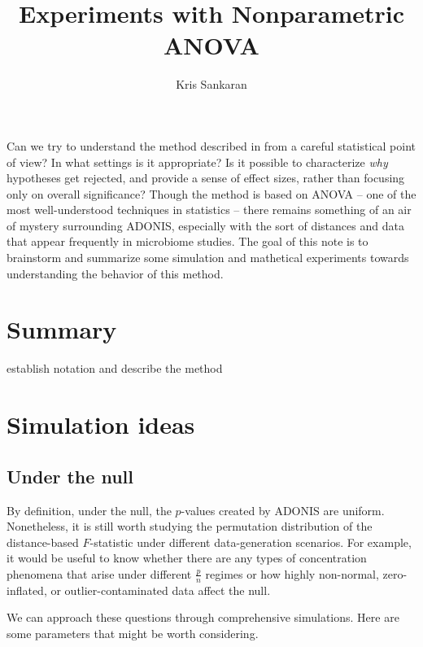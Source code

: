 \documentclass{article}
\title{Experiments with Nonparametric ANOVA}
\author{Kris Sankaran}
\begin{document}
Can we try to understand the method described in \citep{anderson2001new} from a
careful statistical point of view? In what settings is it appropriate? Is it
possible to characterize \textit{why} hypotheses get rejected, and provide a
sense of effect sizes, rather than focusing only on overall significance? Though
the method is based on ANOVA -- one of the most well-understood techniques in
statistics -- there remains something of an air of mystery surrounding ADONIS,
especially with the sort of distances and data that appear frequently in
microbiome studies. The goal of this note is to brainstorm and summarize some
simulation and mathetical experiments towards understanding the behavior of this
method.

\section{Summary}

establish notation and describe the method

\section{Simulation ideas}

\subsection{Under the null}

By definition, under the null, the $p$-values created by ADONIS are uniform.
Nonetheless, it is still worth studying the permutation distribution of the
distance-based $F$-statistic under different data-generation scenarios. For
example, it would be useful to know whether there are any types of concentration
phenomena that arise under different $\frac{p}{n}$ regimes or how highly
non-normal, zero-inflated, or outlier-contaminated data affect the null.

We can approach these questions through comprehensive simulations. Here are some
parameters that might be worth considering.
\end{document}

